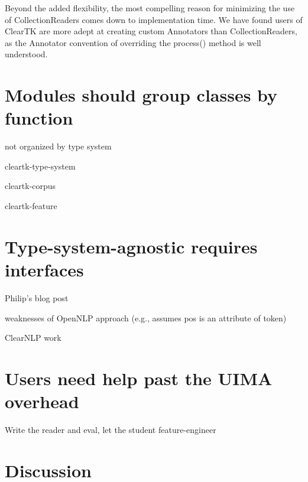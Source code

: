 \documentclass[10pt, a4paper]{article}
\begin{document}
Beyond the added flexibility, the most compelling reason for minimizing the use of CollectionReaders comes down to implementation time.  We have found users of ClearTK are more adept at creating custom Annotators than CollectionReaders, as the Annotator convention of overriding the process() method is well understood.


\section{Modules should group classes by function}
not organized by type system

cleartk-type-system

cleartk-corpus

cleartk-feature


\section{Type-system-agnostic requires interfaces}

Philip's blog post

weaknesses of OpenNLP approach (e.g., assumes pos is an attribute of token)

ClearNLP work


\section{Users need help past the UIMA overhead}

Write the reader and eval, let the student feature-engineer


\section{Discussion}



\end{document}
